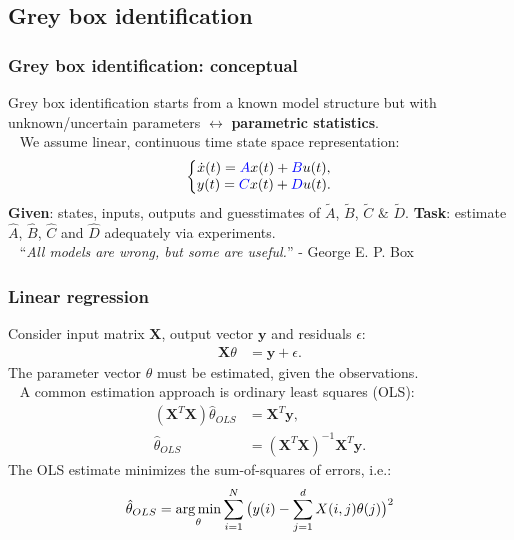 \subsection{Grey box identification}
\begin{frame}
	\frametitle{Grey box identification: conceptual}
	Grey box identification starts from a known model structure but with unknown/uncertain parameters $\leftrightarrow$ \textbf{parametric statistics}. \\
	\pause
	\ \newline
	We assume linear, continuous time state space representation:
	\begin{align*}
	\left\{ \begin{matrix} 
	\dot{x}(t) = {\color{blue}A}x(t) + {\color{blue}B}u(t), \\ 
	y(t) = {\color{blue}C}x(t) + {\color{blue}D}u(t).
	\end{matrix}\right.
	\end{align*}
	\pause
	\textbf{Given}: states, inputs, outputs and guesstimates of $\tilde{A}$, $\tilde{B}$, $\tilde{C}$ $\&$ $\tilde{D}$.
	\pause
	\textbf{Task}: estimate $\hat{A}$, $\hat{B}$, $\hat{C}$ and $\hat{D}$ adequately via experiments.\\
	\ \newline
	\pause
	``\emph{All models are wrong, but some are useful.}'' \hfill - George E. P. Box
\end{frame}

\begin{frame}
	\frametitle{Linear regression}
	Consider input matrix $\mathbf{X}$, output vector $\mathbf{y}$ and residuals $\epsilon$:
	\begin{align*}
	\mathbf{X}\theta &= \mathbf{y} + \epsilon.
	\end{align*}
	The parameter vector $\theta$ must be estimated, given the observations.\\
	\pause
	\ \newline
	A common estimation approach is ordinary least squares (OLS):
	\begin{align*}
	(\mathbf{X}^T\mathbf{X})\hat{\theta}_{OLS} &= \mathbf{X}^T\mathbf{y}, \\
	\hat{\theta}_{OLS} &= (\mathbf{X}^T\mathbf{X})^{-1} \mathbf{X}^T\mathbf{y}.
	\end{align*}
	\pause
	The OLS estimate minimizes the sum-of-squares of errors, i.e.:
	\begin{equation*}
	\hat{\theta}_{OLS} = \operatorname*{arg\,min}_{\theta} \sum_{i=1}^N \big(y(i) - \sum_{j=1}^d X(i,j)\theta(j)\big)^2
	\end{equation*}
\end{frame}

